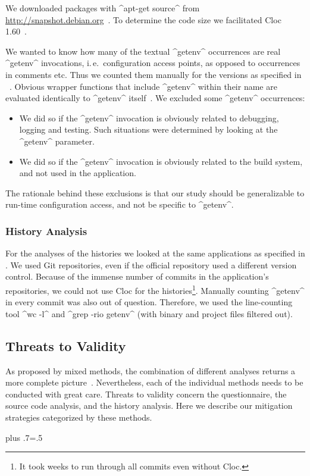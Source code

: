 We downloaded packages with ^apt-get source^ from \url{http://snapshot.debian.org}~\cite{raab2017challenges}.
To determine the code size we facilitated Cloc 1.60~\cite{danial2017cloc}.

We wanted to know how many of the textual ^getenv^ occurrences are  real ^getenv^ invocations, i.\,e.\ configuration access points, as opposed to occurrences in comments etc.
Thus we counted them manually for the versions as specified in ~\cite{raab2017challenges}.
Obvious wrapper functions that include ^getenv^ within their name are evaluated identically to ^getenv^ itself~\cite{raab2017introducing}.
We excluded some ^getenv^ occurrences:
\begin{itemize}
\item
We did so if the ^getenv^ invocation is obviously related to debugging, logging and testing.
Such situations were determined by looking at the ^getenv^ parameter.
\item
We did so if the ^getenv^ invocation is obviously related to the build system, and not used in the application.
\end{itemize}
The rationale behind these exclusions is that our study should be generalizable to run-time configuration access, and not be specific to ^getenv^.

\subsubsection{History Analysis}

For the analyses of the histories we looked at the same applications as specified in .
We used Git repositories, even if the official repository used a different version control.
Because of the immense number of commits in the application's repositories, we could not use Cloc for the histories\footnote{It took weeks to run through all commits even without Cloc.}.
Manually counting ^getenv^ in every commit was also out of question.
Therefore, we used the line-counting tool ^wc -l^ and ^grep -rio getenv^ (with binary and project files filtered out).




\subsection{Threats to Validity}
\label{sec:motivation-threats}

As proposed by mixed methods, the combination of different analyses returns a more complete picture~\cite{ihantola2011threats}.
Nevertheless, each of the individual methods needs to be conducted with great care.
Threats to validity concern the questionnaire, the source code analysis, and the history analysis.
Here we describe our mitigation strategies categorized by these methods.%
{\parfillskip=0pt plus .7\textwidth \emergencystretch=.5\textwidth \par}


